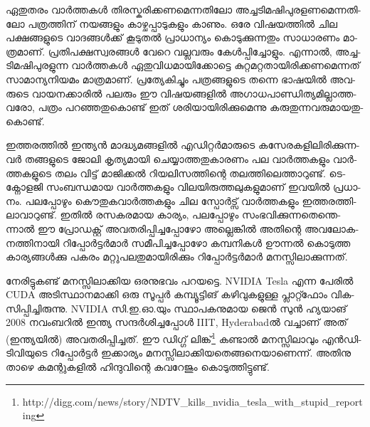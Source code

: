 ഏ­തു­ത­രം വാര്‍­ത്ത­കള്‍ തി­ര­സ്ക­രി­ക്ക­ണ­മെ­ന്ന­തി­ലോ അച്ച­ടി­മ­ഷി­പു­ര­ള­ണ­മെ­ന്ന­തി­ലോ പത്ര­ത്തി­ന് നയ­ങ്ങ­ളും 
കാ­ഴ്ച­പ്പാ­ടു­ക­ളും കാ­ണും. ഒരേ വി­ഷ­യ­ത്തില്‍ ചില പക്ഷ­ങ്ങ­ളു­ടെ വാ­ദ­ങ്ങള്‍­ക്ക് കൂ­ടു­തല്‍ പ്രാ­ധാ­ന്യം കൊ­ടു­ക്കു­ന്ന­തും 
സാ­ധാ­ര­ണം മാ­ത്ര­മാ­ണ്. പ്ര­തി­പ­ക്ഷ­സ്വ­ര­ങ്ങള്‍ വേ­റെ വല്ല­വ­രും കേള്‍­പ്പി­ച്ചോ­ളും. എന്നാല്‍, അച്ച­ടി­മ­ഷി­പു­ര­ളു­ന്ന 
വാര്‍­ത്ത­കള്‍ ഏതു­വി­ധ­മാ­യി­ക്കോ­ട്ടെ കു­റ്റ­മ­റ്റ­താ­യി­രി­ക്ക­ണ­മെ­ന്ന­ത് സാ­മാ­ന്യ­നി­യ­മം മാ­ത്ര­മാ­ണ്. പ്ര­ത്യേ­കി­ച്ചും 
പത്ര­ങ്ങ­ളു­ടെ തന്നെ ഭാ­ഷ­യില്‍ അവ­രു­ടെ വാ­യ­ന­ക്കാ­രില്‍ പല­രും ഈ വി­ഷ­യ­ങ്ങ­ളില്‍ 
അഗാ­ധ­പാ­ണ്ഡി­ത്യ­മി­ല്ലാ­ത്ത­വ­രോ, പത്രം പറ­ഞ്ഞ­തു­കൊ­ണ്ട് ഇത് ശരി­യാ­യി­രി­ക്കു­മെ­ന്നു കരു­തു­ന്ന­വ­രു­മാ­യ­തു­കൊ­ണ്ട്.

ഇ­ത്ത­ര­ത്തില്‍ ഇന്ത്യന്‍ മാ­ദ്ധ്യ­മ­ങ്ങ­ളില്‍ എഡി­റ്റര്‍­മാ­രു­ടെ കസേ­ര­ക­ളി­ലി­രി­ക്കു­ന്ന­വര്‍ തങ്ങ­ളു­ടെ ജോ­ലി കൃ­ത്യ­മാ­യി 
ചെ­യ്യാ­ത്ത­തു­കാ­ര­ണം പല വാര്‍­ത്ത­ക­ളും വാര്‍­ത്ത­ക­ളു­ടെ തലം വി­ട്ട് മാ­ജി­ക്കല്‍ റി­യ­ലി­സ­ത്തി­ന്റെ തല­ത്തി­ലെ­ത്താ­റു­ണ്ട്. 
ടെ­ക്നോ­ള­ജി സം­ബ­ന്ധ­മായ വാര്‍­ത്ത­ക­ളും വി­ല­യി­രു­ത്ത­ലു­ക­ളു­മാ­ണ് ഇവ­യില്‍ പ്ര­ധാ­നം. പല­പ്പോ­ഴും കൌ­തു­ക­വാര്‍­ത്ത­ക­ളും 
ചില സ്പോര്‍­ട്സ് വാര്‍­ത്ത­ക­ളും ഇത്ത­ര­ത്തി­ലാ­വാ­റു­ണ്ട്. ഇതില്‍ രസ­ക­ര­മായ കാ­ര്യം, പല­പ്പോ­ഴും 
സം­ഭ­വി­ക്കു­ന്ന­തെ­ന്തെ­ന്നാല്‍ ഈ പ്രോ­ഡ­ക്റ്റ് അവ­ത­രി­പ്പി­ച്ച­പ്പോ­ഴോ അല്ലെ­ങ്കില്‍ അതി­ന്റെ അവ­ലോ­ക­ന­ത്തി­നാ­യി 
റി­പ്പോര്‍­ട്ടര്‍­മാര്‍ സമീ­പി­ച്ച­പ്പോ­ഴോ കമ്പ­നി­കള്‍ ഊന്നല്‍ കൊ­ടു­ത്ത കാ­ര്യ­ങ്ങള്‍­ക്കു പക­രം മറ്റു­പ­ല­തു­മാ­യി­രി­ക്കും 
റി­പ്പോര്‍­ട്ടര്‍­മാര്‍ മന­സ്സി­ലാ­ക്കു­ന്ന­ത്.

­നേ­രി­ട്ടു­ക­ണ്ട് മന­സ്സി­ലാ­ക്കിയ ഒര­നു­ഭ­വം പറ­യ­ട്ടെ. NVIDIA Tesla എന്ന പേ­രില്‍ CUDA അടി­സ്ഥാ­ന­മാ­ക്കി ഒരു 
സൂ­പ്പര്‍ കമ്പ്യൂ­ട്ടി­ങ് കഴി­വു­ക­ളു­ള്ള പ്ലാ­റ്റ്ഫോം വി­ക­സി­പ്പി­ച്ചി­രു­ന്നു. NVIDIA സി­.ഇ­.ഓ.­യും സ്ഥാ­പ­ക­നു­മായ ജെന്‍ സുന്‍ 
ഹ്യ­യാ­ങ് 2008 നവം­ബ­റില്‍ ഇന്ത്യ സന്ദര്‍­ശി­ച്ച­പ്പോള്‍ IIIT, Hyderabadല്‍ വച്ചാ­ണ് അത് (ഇ­ന്ത്യ­യില്‍) 
അവ­ത­രി­പ്പി­ച്ച­ത്. ഈ ഡിഗ്ഗ് 
ലി­ങ്ക്\footnote{http://digg.com/news/story/NDTV_kills_nvidia_tesla_with_stupid_reporting}
കണ്ടാല്‍ മന­സ്സി­ലാ­വും എന്‍­ഡി­ടി­വി­യു­ടെ റി­പ്പോര്‍­ട്ടര്‍ ഇക്കാ­ര്യം 
മന­സ്സി­ലാ­ക്കി­യ­തെ­ങ്ങ­നെ­യാ­ണെ­ന്ന്. അതി­നു താ­ഴെ കമ­ന്റു­ക­ളില്‍ ഹി­ന്ദു­വി­ന്റെ കവ­റേ­ജും കൊ­ടു­ത്തി­ട്ടു­ണ്ട്.

